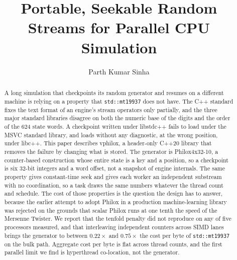\documentclass[acmsmall,screen,review]{acmart}
\makeatletter
\theoremstyle{acmdefinition}
\newcommand{\code}[1]{\texttt{#1}}
\newcommand{\ifanon}[2]{\if@ACM@anonymous#1\else#2\fi}
\makeatother
\begin{document}
\title{Portable, Seekable Random Streams for Parallel CPU Simulation}

\author{Parth Kumar Sinha}

\ifanon{}{\renewcommand{\shortauthors}{Sinha}}

\begin{abstract}
A long simulation that checkpoints its random generator and resumes on a
different machine is relying on a property that \code{std::mt19937} does not
have. The C++ standard fixes the text format of an engine's stream operators
only partially, and the three major standard libraries disagree on both the
numeric base of the digits and the order of the 624 state words. A checkpoint
written under libstdc++ fails to load under the MSVC standard library, and
loads without any diagnostic, at the wrong position, under libc++. This paper
describes vphilox, a header-only C++20 library that removes the failure by
changing what is stored. The generator is Philox4x32-10, a counter-based
construction whose entire state is a key and a position, so a checkpoint is
six 32-bit integers and a word offset, not a snapshot of engine
internals. The same property gives constant-time seek and gives each worker an
independent substream with no coordination, so a task draws the same numbers
whatever the thread count and schedule. The cost of those properties is the question the design
has to answer, because the earlier attempt to adopt Philox in a production
machine-learning library was rejected on the grounds that scalar Philox runs at
one tenth the speed of the Mersenne Twister. We report that the tenfold penalty
did not reproduce on any of five processors measured, and that interleaving
independent counters across SIMD lanes brings the generator to between
$0.22\times$ and $0.75\times$ the cost per byte of \code{std::mt19937} on the
bulk path. Aggregate cost per byte is flat across thread counts, and the first
parallel limit we find is hyperthread co-location, not the generator.
\end{abstract}
\end{document}
